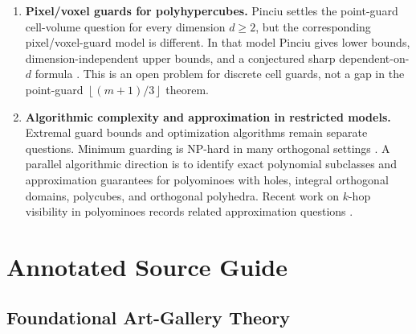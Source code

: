 \documentclass[11pt]{article}
\newcommand{\floor}[1]{\left\lfloor #1 \right\rfloor}
\begin{document}
\begin{enumerate}
  The same prompt can be phrased through the unit-refined boundary
  1-skeleton.  Let $E_{\partial}$ be the number of unit edges in the boundary
  surface mesh.  For a closed unit-square boundary surface, each square
  contributes four edge incidences and each boundary edge is incident to two
  squares, so $E_{\partial}=2S$.  In that refined model the target $S/8$ is
  exactly $E_{\partial}/16$.  This is not the unrefined edge count $m$ used in
  continuous edge-guard results: scaling an orthogonal box changes Euclidean
  surface area while leaving the unrefined polyhedron graph unchanged.  If
  ``size of the 1D skeleton'' means $V_{\partial}+E_{\partial}$ instead of
  edge count alone, the connected orientable case also carries the Euler term
  $V_{\partial}+E_{\partial}=3S+2-2g$, so the convention should be stated
  before this becomes a theorem-style conjecture.

  \item \textbf{Pixel/voxel guards for polyhypercubes.}
  Pinciu settles the point-guard cell-volume question for every dimension
  $d\geq 2$, but the corresponding pixel/voxel-guard model is different.  In
  that model Pinciu gives lower bounds, dimension-independent upper bounds, and
  a conjectured sharp dependent-on-$d$ formula \cite{Pinciu2015}.  This is an
  open problem for discrete cell guards, not a gap in the point-guard
  $\floor{(m+1)/3}$ theorem.

  \item \textbf{Algorithmic complexity and approximation in restricted models.}
  Extremal guard bounds and optimization algorithms remain separate questions.
  Minimum guarding is NP-hard in many orthogonal settings
  \cite{LeeLin1986,SchuchardtHecker1995,KatzRoisman2008,BiedlEtAl2012,DurocherEtAl2017,BiedlEtAl2019}.
  A parallel algorithmic direction is to identify exact polynomial subclasses
  and approximation guarantees for polyominoes with holes, integral orthogonal
  domains, polycubes, and orthogonal polyhedra.  Recent work on $k$-hop
  visibility in polyominoes records related approximation questions
  \cite{FiltserEtAl2025}.
\end{enumerate}

\section{Annotated Source Guide}

\subsection*{Foundational Art-Gallery Theory}
\end{document}

